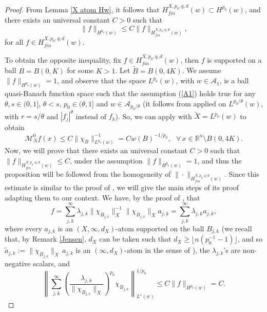 \documentclass[oneside,10pt]{article}
\begin{document}
\begin{proof}
From Lemma \ref{X atom Hw}, it follows that $H^{X, p_0, q, d}_{fin}(w) \subset H^{p_0}(w)$, and there exists an universal constant 
$C > 0$ such that
\[ 
\| f \|_{H^{p_0}(w)} \leq C \| f \|_{H^{X, p_0, q, d}_{fin}(w)},
\]
for all $f \in H^{X, p_0, q, d}_{fin}(w)$. 

To obtain the opposite inequality, fix $f \in H^{X, p_0, q, d}_{fin}(w)$, then $f$ is supported on a ball $B = B(0, K)$ for some $K > 1$. 
Let $\widetilde{B} = B(0, 4K)$. We assume $\| f \|_{H^{p_0}(w)} = 1$, and observe that the space $L^{p_0}(w)$, with $w \in \mathcal{A}_1$, is a ball quasi-Banach function space such that the assumption (\ref{A1}) holds true for any $\theta, s \in (0,1]$, $\theta < s$, 
$p_0 \in (\theta, 1]$ and $w \in \mathcal{A}_{p_0/\theta}$ (it follows from \cite[Theorem 3.1 (b)]{John} applied on $L^{p_0/\theta}(w)$, with 
$r = s/\theta$ and $|f_j|^{\theta}$ instead of $f_k$). So, we can apply \cite[Lemma 2.4]{Yan} with $\widetilde{X} = L^{p_0}(w)$ to obtain 
\begin{equation} \label{pointwise grand max}
\mathcal{M}_{N}^{0} f(x) \leq C \| \chi_B \|_{L^{p_0}(w)}^{-1} = C w(B)^{-1/p_0}, \,\,\,\, \forall \, x \in \mathbb{R}^n \setminus B(0, 4K).
\end{equation}
Now, we will prove that there exists an universal constant $C>0$ such that  $\| f \|_{H^{X, p_0, q, d}_{fin}(w)} \leq C$, under the assumption 
$\| f \|_{H^{p_0}(w)} = 1$, and thus the proposition will be followed from the homogeneity of $\| \cdot \|_{H^{X, p_0, q, d}_{fin}(w)}$. Since this estimate is similar to the proof of \cite[Lemma 7.11]{UrWang}, we will give the main steps of its proof adapting them to our context. We have, by the proof of \cite[Theorem 1, on p. 118]{tor}, that
\[
f = \sum_{j,k}^{\infty} \lambda_{j,k} \| \chi_{B_{j,k}} \|_{X}^{-1} \| \chi_{B_{j,k}} \|_{X} a_{j,k} = \sum_{j,k}^{\infty} \lambda_{j,k} 
a_{j,k},
\]
where every $a_{j,k}$ is an $(X, \infty, d_X)$-atom supported on the ball $B_{j,k}$ (we recall that, by Remark \ref{Jensen}, $d_X$ can be 
taken such that $d_X \geq \lfloor n (p_0^{-1} - 1) \rfloor$, and so $\widetilde{a}_{j,k} := \| \chi_{B_{j,k}} \|_{X} \, a_{j,k}$ is 
an $(\infty, d_X)$-atom in the sense of \cite[p. 111]{tor}), the $\lambda_{j,k}$'s are non-negative scalars, and
\begin{equation} \label{ineq pesada}
\left\| \sum_{j,k}^{\infty} \left( \frac{\lambda_{j,k}}{\| \chi_{B_{j,k}} \|_{X}} \right)^{p_0} \chi_{B_{j,k}} \right\|_{L^1(w)}^{1/p_0} \leq
C \| f \|_{H^{p_0}(w)} = C.

\end{equation}
\end{proof}
\end{document}
